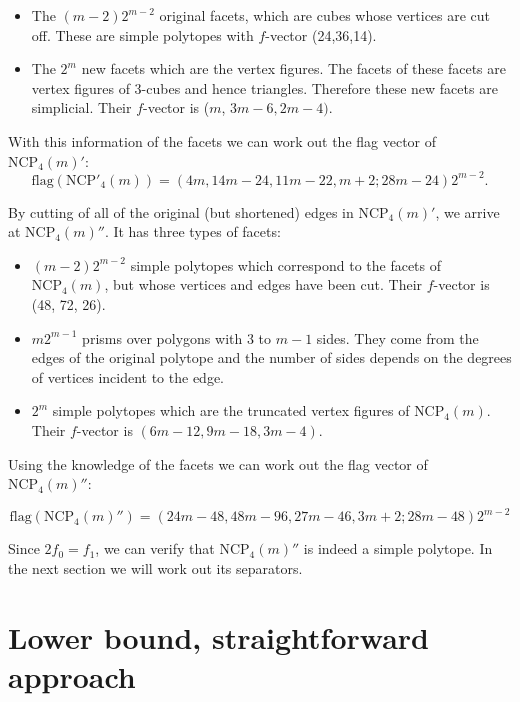 \documentclass[a4paper,12pt]{book}
\theoremstyle{plain}
\theoremstyle{definition}
\newcommand\NC{\textrm{NCP}}
\begin{document}
\begin{itemize}
 \item The $(m-2)2^{m-2}$ original facets, which are cubes whose vertices are 
cut off. These are simple polytopes with $f$-vector (24,36,14).
 \item The $2^m$ new facets which are the vertex figures. The facets of these 
facets are vertex figures of 3-cubes and hence triangles. Therefore these 
new facets are simplicial. Their $f$-vector is ($m$, 
$3m-6, 2m-4)$.
\end{itemize}

With this information of the facets we can work out the flag vector of $\NC_4(m)'$:
\begin{equation}
 \textrm{flag}(\NC'_4(m)) = (4m, 14m-24, 11m-22, m+2; 28m-24)2^{m-2}.
\end{equation}

By cutting of all of the original (but shortened) edges in $\NC_4(m)'$, we arrive at 
$\NC_4(m)''$. It has three types of facets:

\begin{itemize}
 \item $(m-2)2^{m-2}$ simple polytopes which correspond to the facets of 
$\NC_4(m)$, but whose vertices and edges have been cut. Their $f$-vector is 
(48, 72, 26).
\item $m2^{m-1}$ prisms over polygons with $3$ to $m-1$ sides. They come from 
the edges of the original polytope and the number of sides depends on the degrees of 
vertices incident to the edge.
\item $2^m$ simple polytopes which are the truncated vertex figures of 
$\NC_4(m)$. Their $f$-vector is $(6m - 12, 9m-18, 3m-4)$.
\end{itemize}

Using the knowledge of the facets we can work out the flag vector of 
$\NC_4(m)''$:

\begin{equation}
 \textrm{flag}(\NC_4(m)'') = (24m-48, 48m-96, 27m - 46, 3m+2; 28m -48)2^{m-2}
\end{equation}

Since $2f_0 = f_1$, we can verify that $\NC_4(m)''$ is indeed a simple 
polytope. In the next section we will work out its separators.

\section{Lower bound, straightforward approach}
\end{document}

